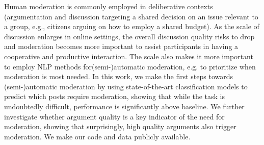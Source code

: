 Human moderation is commonly employed in deliberative contexts (argumentation and discussion targeting a shared decision on an issue relevant to a group, e.g., citizens arguing on how to employ a shared budget).  As the scale of discussion enlarges in online settings, the overall discussion quality risks to drop and moderation becomes more important to assist participants in having a cooperative and productive interaction.  The scale also makes it more important to employ NLP methods for(semi-)automatic moderation, e.g. to prioritize when moderation is most needed. In this work, we make the first steps towards (semi-)automatic moderation by using state-of-the-art classification models to predict which posts require moderation, showing that while the task is undoubtedly difficult, performance is significantly above baseline. We further investigate whether argument quality is a key indicator of the need for moderation, showing that surprisingly, high quality arguments also trigger moderation. We make our code and data publicly available.
